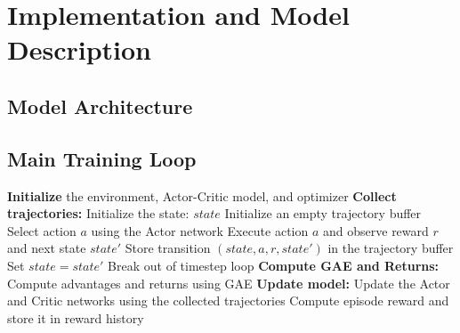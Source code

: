 \section{Implementation and Model Description}
\label{sec:implementation-and-model-description}

\subsection{Model Architecture}
\label{subsec:model-architecture}

\subsection{Main Training Loop}
\begin{algorithmic}
    \State \textbf{Initialize} the environment, Actor-Critic model, and optimizer
        \State \textbf{Collect trajectories:}
        \State \hspace{1em} Initialize the state: $state$
        \State \hspace{1em} Initialize an empty trajectory buffer
            \State \hspace{1em} Select action $a$ using the Actor network
            \State \hspace{1em} Execute action $a$ and observe reward $r$ and next state $state'$
            \State \hspace{1em} Store transition $(state, a, r, state')$ in the trajectory buffer
            \State \hspace{1em} Set $state = state'$
                \State \hspace{1em} Break out of timestep loop
            \EndIf
        \EndFor
        \State \textbf{Compute GAE and Returns:}
        \State \hspace{1em} Compute advantages and returns using GAE
        \State \textbf{Update model:}
        \State \hspace{1em} Update the Actor and Critic networks using the collected trajectories
        \State \hspace{1em} Compute episode reward and store it in reward history
    \EndFor
\end{algorithmic}


